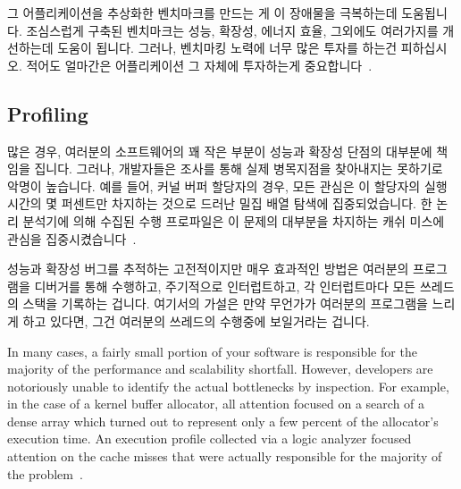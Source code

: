 그 어플리케이션을 추상화한 벤치마크를 만드는 게 이 장애물을 극복하는데
도움됩니다.
조심스럽게 구축된 벤치마크는 성능, 확장성, 에너지 효율, 그외에도 여러가지를
개선하는데 도움이 됩니다.
그러나, 벤치마킹 노력에 너무 많은 투자를 하는건 피하십시오.
적어도 얼마간은 어플리케이션 그 자체에 투자하는게 중요합니다~\cite{Gray91}.

\subsection{Profiling}
\label{sec:debugging:Profiling}

많은 경우, 여러분의 소프트웨어의 꽤 작은 부분이 성능과 확장성 단점의 대부분에
책임을 집니다.
그러나, 개발자들은 조사를 통해 실제 병목지점을 찾아내지는 못하기로 악명이
높습니다.
예를 들어, 커널 버퍼 할당자의 경우, 모든 관심은 이 할당자의 실행 시간의 몇
퍼센트만 차지하는 것으로 드러난 밀집 배열 탐색에 집중되었습니다.
한 논리 분석기에 의해 수집된 수행 프로파일은 이 문제의 대부분을 차지하는 캐쉬
미스에 관심을 집중시켰습니다~\cite{McKenney93}.

성능과 확장성 버그를 추적하는 고전적이지만 매우 효과적인 방법은 여러분의
프로그램을 디버거를 통해 수행하고, 주기적으로 인터럽트하고, 각 인터럽트마다
모든 쓰레드의 스택을 기록하는 겁니다.
여기서의 가설은 만약 무언가가 여러분의 프로그램을 느리게 하고 있다면, 그건
여러분의 쓰레드의 수행중에 보일거라는 겁니다.

\iffalse

In many cases, a fairly small portion of your software is responsible
for the majority of the performance and scalability shortfall.
However, developers are notoriously unable to identify the actual
bottlenecks by inspection.
For example, in the case of a kernel buffer allocator, all attention focused
on a search of a dense array which turned out to represent only
a few percent of the allocator's execution time.
An execution profile collected via a logic analyzer focused attention
on the cache misses that were actually responsible for the majority
of the problem~\cite{McKenney93}.

